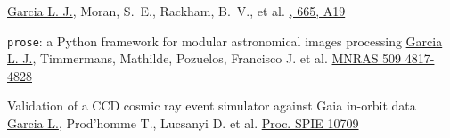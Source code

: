     {\underline{Garcia L. J.}, Moran, S.~E., Rackham, B.~V., et al.}
    {\href{https://ui.adsabs.harvard.edu/abs/2022A\&A...665A..19G}{\aap, 665, A19}}

    {\texttt{prose}: a Python framework for modular astronomical images processing}
    {\underline{Garcia L. J.}, Timmermans, Mathilde, Pozuelos, Francisco J. et al.}
    {\href{https://ui.adsabs.harvard.edu/abs/2022MNRAS.509.4817G/exportcitation}{MNRAS 509 4817-4828}}

    {Validation of a CCD cosmic ray event simulator against Gaia in-orbit data}
    {\underline{Garcia L.}, Prod'homme T., Lucsanyi D. et al.}
    {\href{http://doi.org/10.1117/12.2314090}{Proc. SPIE 10709}}
